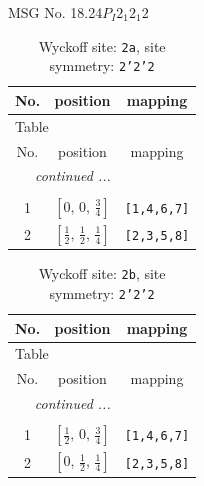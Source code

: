 \documentclass[fleqn,8pt]{jsarticle}
\begin{document}
\setcounter{MaxMatrixCols}{32}

\renewcommand{\tablename}{Table~}
\renewcommand{\figurename}{Figure~}
\begin{center}
\LARGE
MSG No. 18.24\quad$P_{I}2_{1}2_{1}2$
\end{center}
\renewcommand{\arraystretch}{1.2}
\begin{longtable}{ccc}
\caption{Wyckoff site: {\tt 2a}, site symmetry: {\tt 2'2'2}}
 \\
 \hline \hline
No. & position & mapping \\ \hline \endfirsthead

\multicolumn{2}{l}{\tablename\ \thetable{}} \\
 \hline \hline
No. & position & mapping \\ \hline \endhead

 \hline \hline
\multicolumn{2}{r}{\footnotesize\it continued ...} \\ \endfoot

 \hline \hline
\multicolumn{2}{r}{} \\ \endlastfoot

1 & $\left[ 0,\, 0,\, \frac{3}{4} \right]$ & {\tt [1,4,6,7]} \\ \hline
2 & $\left[ \frac{1}{2},\, \frac{1}{2},\, \frac{1}{4} \right]$ & {\tt [2,3,5,8]} \\
\end{longtable}
\renewcommand{\arraystretch}{1.2}
\begin{longtable}{ccc}
\caption{Wyckoff site: {\tt 2b}, site symmetry: {\tt 2'2'2}}
 \\
 \hline \hline
No. & position & mapping \\ \hline \endfirsthead

\multicolumn{2}{l}{\tablename\ \thetable{}} \\
 \hline \hline
No. & position & mapping \\ \hline \endhead

 \hline \hline
\multicolumn{2}{r}{\footnotesize\it continued ...} \\ \endfoot

 \hline \hline
\multicolumn{2}{r}{} \\ \endlastfoot

1 & $\left[ \frac{1}{2},\, 0,\, \frac{3}{4} \right]$ & {\tt [1,4,6,7]} \\ \hline
2 & $\left[ 0,\, \frac{1}{2},\, \frac{1}{4} \right]$ & {\tt [2,3,5,8]} \\
\end{longtable}
\end{document}
